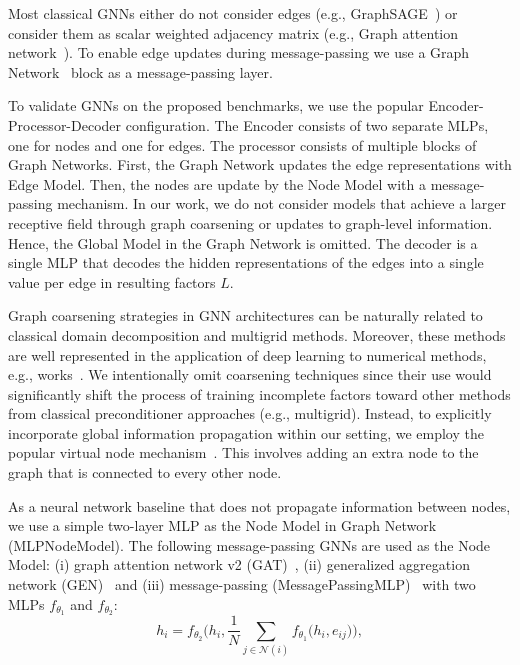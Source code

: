 \documentclass[10pt]{article} %
\theoremstyle{plain}
\theoremstyle{definition}
\theoremstyle{remark}
\begin{document}
Most classical GNNs either do not consider edges (e.g., GraphSAGE~\citep{hamilton2017inductive}) or consider them as scalar weighted adjacency matrix (e.g., Graph attention network~\citep{velivckovic2017graph}). To enable edge updates during message-passing we use a Graph Network~\citep{battaglia2018relational} block as a message-passing layer.

To validate GNNs on the proposed benchmarks, we use the popular Encoder-Processor-Decoder configuration. The Encoder consists of two separate MLPs, one for nodes and one for edges. The processor consists of multiple blocks of Graph Networks. First, the Graph Network updates the edge representations with Edge Model. Then, the nodes are update by the Node Model with a message-passing mechanism. In our work, we do not consider models that achieve a larger receptive field through graph coarsening or updates to graph-level information. Hence, the Global Model in the Graph Network is omitted. The decoder is a single MLP that decodes the hidden representations of the edges into a single value per edge in resulting factors $L$.

Graph coarsening strategies in GNN architectures can be naturally related to classical domain decomposition and multigrid methods. Moreover, these methods are well represented in the application of deep learning to numerical methods, e.g.,  works~\citet{taghibakhshi2022learning, taghibakhshi2023mg, katrutsa2020black, luz2020learning}. We intentionally omit coarsening techniques since their use would significantly shift the process of training incomplete factors toward other methods from classical preconditioner approaches (e.g., multigrid). Instead, to explicitly incorporate global information propagation within our setting, we employ the popular virtual node mechanism~\citep{southern2024understanding}. This involves adding an extra node to the graph that is connected to every other node.

As a neural network baseline that does not propagate information between nodes, we use a simple two-layer MLP as the Node Model in Graph Network (MLPNodeModel). The following message-passing GNNs are used as the Node Model: (i) graph attention network v2 (GAT)~\citep{brody2021attentive}, (ii) generalized aggregation network (GEN)~\citep{li2020deepergcn} and (iii) message-passing (MessagePassingMLP)~\citep{gilmer2017neural} with two MLPs $f_{\theta_1}$ and $f_{\theta_2}$:
\begin{equation*}
    h_{i} = f_{\theta_2}\bigg(h_i, \frac{1}{N}\sum_{j\in\mathcal{N}(i)}f_{\theta_1}\big(h_i, e_{ij}\big)\bigg),
\end{equation*}
\end{document}
